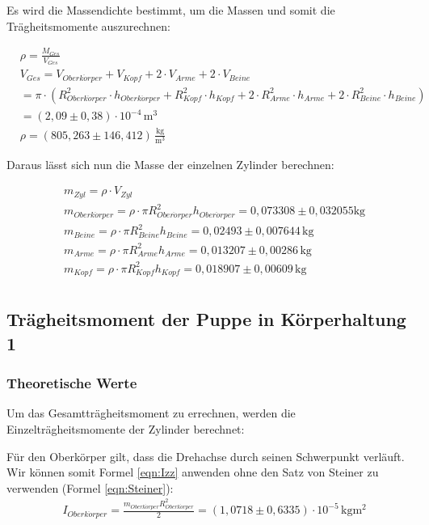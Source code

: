 Es wird die Massendichte bestimmt, um die Massen und somit die Trägheitsmomente auszurechnen:

\begin{align*}
& \rho = \frac{M_{Ges}}{V_{Ges}} \\
&  V_{Ges} = V_{Oberk\ddot{o}rper} + V_{Kopf} + 2 \cdot V_{Arme} + 2 \cdot V_{Beine} \\
&  = \pi \cdot \left(R_{Oberk\ddot{o}rper}^2  \cdot h_{Oberk\ddot{o}rper} + R_{Kopf}^2 \cdot h_{Kopf} + 2 \cdot R_{Arme}^2 \cdot h_{Arme} +2 \cdot R_{Beine}^2 \cdot h_{Beine} \right) \\
&  = (2{,}09 \pm 0{,}38) \cdot 10^{-4} \, \mathrm{m^3} \\
& \rho = (805{,}263 \pm 146{,}412) \, \mathrm{\frac{kg}{m^3}}
\end{align*}

Daraus lässt sich nun die Masse der einzelnen Zylinder berechnen:

\begin{align*}
  &  m_{Zyl} = \rho \cdot V_{Zyl} \\
  &  m_{Oberk\ddot{o}rper} = \rho \cdot \pi R_{Ober\ddot{o}rper}^2 h_{Ober\ddot{o}rper} = 0{,}073308 \pm 0{,}032055 \mathrm{kg} \\
  &  m_{Beine} = \rho \cdot \pi R_{Beine}^2 h_{Beine} = 0{,}02493 \pm 0{,}007644 \, \mathrm{kg} \\
  &  m_{Arme} = \rho \cdot \pi R_{Arme}^2 h_{Arme} = 0{,}013207 \pm 0{,}00286 \, \mathrm{kg} \\
  &  m_{Kopf} = \rho \cdot \pi R_{Kopf}^2 h_{Kopf} = 0{,}018907 \pm 0{,}00609 \, \mathrm{kg} \\
\end{align*}

\subsection{Trägheitsmoment der Puppe in Körperhaltung 1}
\label{sec:TraegheitsmomentderPuppeinKoerperhaltung 1}
\subsubsection{Theoretische Werte}

Um das Gesamtträgheitsmoment zu errechnen, werden die Einzelträgheitsmomente der Zylinder berechnet:

Für den Oberkörper gilt, dass die Drehachse durch seinen Schwerpunkt verläuft. Wir können somit Formel \ref{eqn:Izz} anwenden ohne den 
Satz von Steiner zu verwenden (Formel \ref{eqn:Steiner}):
\begin{align*}
  & I_{Oberk\ddot{o}rper} = \frac{m_{Oberk\ddot{o}rper}R_{Oberk\ddot{o}rper}^2}{2} = (1{,}0718 \pm 0{,}6335) \cdot 10^{-5} \, \mathrm{kgm^2}
\end{align*}

